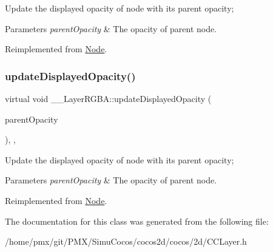Update the displayed opacity of node with it\textquotesingle{}s parent opacity; 
\begin{DoxyParams}{Parameters}
{\em parent\+Opacity} & The opacity of parent node. \\
\hline
\end{DoxyParams}


Reimplemented from \hyperlink{classNode_a3a0122884e7e1ce310b8b68abfbb245b}{Node}.

\mbox{\label{class____LayerRGBA_a53e78a19fb9780fec84476f1bce1d3f6}} 
\subsubsection{\texorpdfstring{update\+Displayed\+Opacity()}{updateDisplayedOpacity()}\hspace{0.1cm}{\footnotesize\ttfamily [2/2]}}
{\footnotesize\ttfamily virtual void \+\_\+\+\_\+\+Layer\+R\+G\+B\+A\+::update\+Displayed\+Opacity (\begin{DoxyParamCaption}\item[{G\+Lubyte}]{parent\+Opacity }\end{DoxyParamCaption})\hspace{0.3cm}{\ttfamily [inline]}, {\ttfamily [override]}, {\ttfamily [virtual]}}

Update the displayed opacity of node with it\textquotesingle{}s parent opacity; 
\begin{DoxyParams}{Parameters}
{\em parent\+Opacity} & The opacity of parent node. \\
\hline
\end{DoxyParams}


Reimplemented from \hyperlink{classNode_a3a0122884e7e1ce310b8b68abfbb245b}{Node}.



The documentation for this class was generated from the following file\+:\begin{DoxyCompactItemize}
\item 
/home/pmx/git/\+P\+M\+X/\+Simu\+Cocos/cocos2d/cocos/2d/C\+C\+Layer.\+h\end{DoxyCompactItemize}
